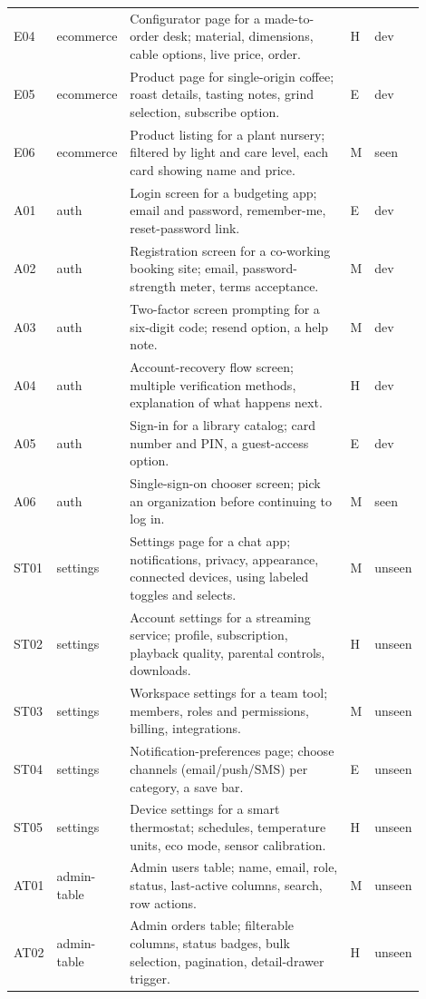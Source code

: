 \begin{small}
\begin{longtable}{@{}p{0.045\linewidth}p{0.075\linewidth}p{0.70\linewidth}p{0.02\linewidth}p{0.055\linewidth}@{}}
E04 & ecommerce & Configurator page for a made-to-order desk; material, dimensions, cable options, live price, order. & H & dev \\
E05 & ecommerce & Product page for single-origin coffee; roast details, tasting notes, grind selection, subscribe option. & E & dev \\
E06 & ecommerce & Product listing for a plant nursery; filtered by light and care level, each card showing name and price. & M & seen \\
A01 & auth & Login screen for a budgeting app; email and password, remember-me, reset-password link. & E & dev \\
A02 & auth & Registration screen for a co-working booking site; email, password-strength meter, terms acceptance. & M & dev \\
A03 & auth & Two-factor screen prompting for a six-digit code; resend option, a help note. & M & dev \\
A04 & auth & Account-recovery flow screen; multiple verification methods, explanation of what happens next. & H & dev \\
A05 & auth & Sign-in for a library catalog; card number and PIN, a guest-access option. & E & dev \\
A06 & auth & Single-sign-on chooser screen; pick an organization before continuing to log in. & M & seen \\
ST01 & settings & Settings page for a chat app; notifications, privacy, appearance, connected devices, using labeled toggles and selects. & M & unseen \\
ST02 & settings & Account settings for a streaming service; profile, subscription, playback quality, parental controls, downloads. & H & unseen \\
ST03 & settings & Workspace settings for a team tool; members, roles and permissions, billing, integrations. & M & unseen \\
ST04 & settings & Notification-preferences page; choose channels (email/push/SMS) per category, a save bar. & E & unseen \\
ST05 & settings & Device settings for a smart thermostat; schedules, temperature units, eco mode, sensor calibration. & H & unseen \\
AT01 & admin-table & Admin users table; name, email, role, status, last-active columns, search, row actions. & M & unseen \\
AT02 & admin-table & Admin orders table; filterable columns, status badges, bulk selection, pagination, detail-drawer trigger. & H & unseen \\

\end{longtable}
\end{small}
